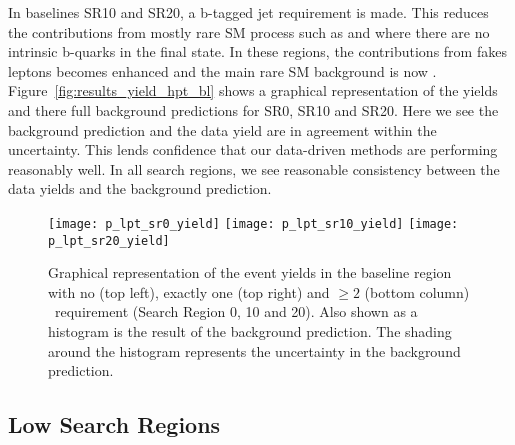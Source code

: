 \clearpage
In baselines SR10 and SR20, a b-tagged jet requirement is made. This reduces
the contributions from mostly rare SM process such as \WZ and \qqWW where
there are no intrinsic b-quarks in the final state. In these regions, the
contributions from fakes leptons becomes enhanced and the main rare SM
background is now \ttW. Figure~\ref{fig:results_yield_hpt_bl} shows a graphical
representation of the yields and there full background predictions for SR0,
SR10 and SR20. Here we see the background prediction and the data yield
are in agreement within the uncertainty. This lends confidence that our
data-driven methods are performing reasonably well. In all search regions,
we see reasonable consistency between the data yields and the background
prediction.

\begin{figure}[!hbt]
\begin{center}
\texttt{[image: p\_lpt\_sr0\_yield]}
\texttt{[image: p\_lpt\_sr10\_yield]}
\texttt{[image: p\_lpt\_sr20\_yield]}
\caption[Graphical representation of the event yields in the \lpt baseline region]
{\label{fig:results_lpt_yield_bl}
Graphical representation of the event yields in the \lpt baseline region
with no (top left), exactly one (top right) and $\geq 2$ (bottom column)
\nbtags~requirement (Search Region 0, 10 and 20). Also shown as a histogram
is the result of the background prediction. The shading around the histogram
represents the uncertainty in the background prediction.
}
\end{center}
\end{figure}

\subsection{Low \pt Search Regions}
\label {sec:results_lpt_sr}

